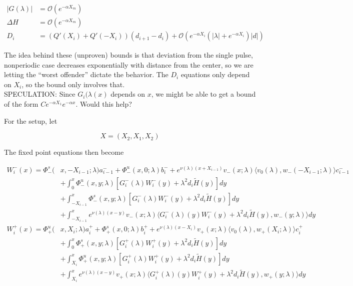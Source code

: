 \documentclass[12pt]{article}
\begin{document}
\begin{align*}
|G(\lambda)| &= \mathcal{O}(e^{-\alpha X_m}) \\
\Delta H &= \mathcal{O}(e^{-\alpha X_m}) \\
D_i &= ( Q'(X_i) + Q'(-X_i))(d_{i+1} - d_i ) + \mathcal{O} \left( e^{-\alpha X_i} \left( |\lambda| +  e^{-\alpha X_i}  \right) |d| \right)
\end{align*}

The idea behind these (unproven) bounds is that deviation from the single pulse, nonperiodic case decreases exponentially with distance from the center, so we are letting the ``worst offender'' dictate the behavior. The $D_i$ equations only depend on $X_i$, so the bound only involves that. \\

SPECULATION: Since $G_i(\lambda(x)$ depends on $x$, we might be able to get a bound of the form $C e^{-\alpha X_1}e^{-\alpha x}$. Would this help?

For the setup, let

\[
X = (X_2, X_1, X_2)
\]

The fixed point equations then become

\begin{align*}
W_i^-(x) = \Phi^s_-(&x, -X_{i-1}; \lambda)a_{i-1}^- + \Phi^u_-(x, 0; \lambda)b_i^- + e^{\nu(\lambda)(x+X_{i-1})} v_-(x; \lambda) \langle v_0(\lambda), w_-(-X_{i-1}; \lambda) \rangle c_{i-1}^- \\
&+ \int_0^x \Phi^u_-(x, y; \lambda)[ G_i^-(\lambda)W_i^-(y) + \lambda^2 d_i \tilde{H}(y) ] dy \\
&+ \int_{-X_{i-1}}^x \Phi^s_-(x, y; \lambda) [ G_i^-(\lambda)W_i^-(y) + \lambda^2 d_i \tilde{H}(y) ] dy \\
&+ \int_{-X_{i-1}}^x 
e^{\nu(\lambda)(x-y)} v_-(x; \lambda) \langle G_i^-(\lambda)(y)W_i^-(y) + \lambda^2 d_i \tilde{H}(y), w_-(y; \lambda) \rangle dy \\
W_i^+(x) = \Phi^u_+(&x, X_i; \lambda)a_i^+ + \Phi^s_+(x, 0; \lambda)b_i^+ + e^{\nu(\lambda)(x - X_i)} v_+(x; \lambda) \langle v_0(\lambda), w_+(X_i; \lambda) \rangle c_i^+ \\
&+ \int_0^x \Phi^s_+(x, y; \lambda) [ G_i^+(\lambda)W_i^+(y) + \lambda^2 d_i \tilde{H}(y) ] dy \\
&+ \int_{X_i}^x \Phi^u_+(x, y; \lambda) [ G_i^+(\lambda)W_i^+(y) + \lambda^2 d_i \tilde{H}(y) ] dy \\
&+ \int_{X_i}^x e^{\nu(\lambda)(x-y)} v_+(x; \lambda) \langle G_i^+(\lambda)(y)W_i^+(y) + \lambda^2 d_i \tilde{H}(y), w_+(y; \lambda) \rangle dy
\end{align*}
\end{document}
